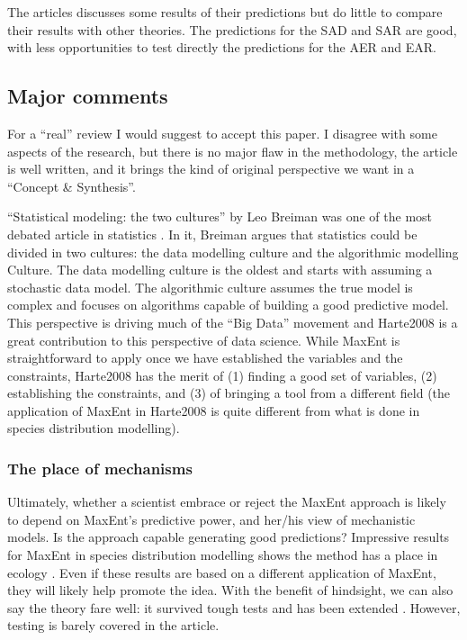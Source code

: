 \documentclass[letterpaper,12pt]{article}
\begin{document}
The articles discusses some results of their predictions but do little to
compare their results with other theories. The predictions for the SAD and SAR
are good, with less opportunities to test directly the predictions for the AER
and EAR.

\subsection{Major comments}

For a ``real'' review I would suggest to accept this paper. I disagree with
some aspects of the research, but there is no major flaw in the methodology,
the article is well written, and it brings the kind of original perspective
we want in a ``Concept \& Synthesis''.

``Statistical modeling: the two cultures'' by Leo Breiman was one of the
most debated article in statistics \cite{bre01,nor11}. In it, Breiman argues
that statistics could be divided in two cultures: the data modelling culture
and the algorithmic modelling Culture. The data modelling culture is the
oldest and starts with assuming a stochastic data model. The algorithmic
culture assumes the true model is complex and focuses on algorithms capable
of building a good predictive model. This perspective is driving much of the
``Big Data'' movement \cite {hal09} and Harte2008 is a great contribution to
this perspective of data science. While MaxEnt is straightforward to apply
once we have established the variables and the constraints, Harte2008 has
the merit of (1) finding a good set of variables, (2) establishing the
constraints, and (3) of bringing a tool from a different field (the
application of MaxEnt in Harte2008 is quite different from what is done in
species distribution modelling).

\subsubsection{The place of mechanisms}

Ultimately, whether a scientist embrace or reject the MaxEnt approach is
likely to depend on MaxEnt's predictive power, and her/his view of
mechanistic models. Is the approach capable generating good predictions?
Impressive results for MaxEnt in species distribution modelling shows the
method has a place in ecology \cite {fra10,eti11}. Even if these results are
based on a different application of MaxEnt, they will likely help promote
the idea. With the benefit of hindsight, we can also say the theory fare
well: it survived tough tests \cite{xia13} and has been extended \cite
{whi12,mcg13}. However, testing is barely covered in the article.
\end{document}
